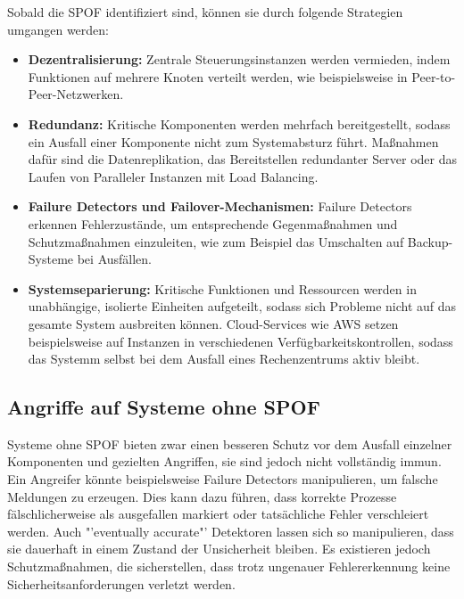 \documentclass[a4paper,12pt]{article}
\begin{document}
Sobald die SPOF identifiziert sind, können sie durch folgende Strategien umgangen werden:

\begin{itemize}
    \item \textbf{Dezentralisierung:} Zentrale Steuerungsinstanzen werden vermieden, indem Funktionen auf mehrere Knoten verteilt werden, wie beispielsweise in Peer-to-Peer-Netzwerken.
    \item \textbf{Redundanz:} Kritische Komponenten werden mehrfach bereitgestellt, sodass ein Ausfall einer Komponente nicht zum Systemabsturz führt. Maßnahmen dafür sind die Datenreplikation, das Bereitstellen redundanter Server oder das Laufen von Paralleler Instanzen mit Load Balancing.
    \item \textbf{Failure Detectors und Failover-Mechanismen:} Failure Detectors erkennen Fehlerzustände, um entsprechende Gegenmaßnahmen und Schutzmaßnahmen einzuleiten, wie zum Beispiel das Umschalten auf Backup-Systeme bei Ausfällen.
    \item \textbf{Systemseparierung:} Kritische Funktionen und Ressourcen werden in unabhängige, isolierte Einheiten aufgeteilt, sodass sich Probleme nicht auf das gesamte System ausbreiten können. Cloud-Services wie AWS setzen beispielsweise auf Instanzen in verschiedenen Verfügbarkeitskontrollen, sodass das Systemm selbst bei dem Ausfall eines Rechenzentrums aktiv bleibt.
\end{itemize}

\subsection{Angriffe auf Systeme ohne SPOF}
Systeme ohne SPOF bieten zwar einen besseren Schutz vor dem Ausfall einzelner Komponenten und gezielten Angriffen, sie sind jedoch nicht vollständig immun. Ein Angreifer könnte beispielsweise Failure Detectors manipulieren, um falsche Meldungen zu erzeugen. Dies kann dazu führen, dass korrekte Prozesse fälschlicherweise als ausgefallen markiert oder tatsächliche Fehler verschleiert werden. Auch "'eventually accurate"' Detektoren lassen sich so manipulieren, dass sie dauerhaft in einem Zustand der Unsicherheit bleiben. Es existieren jedoch Schutzmaßnahmen, die sicherstellen, dass trotz ungenauer Fehlererkennung keine Sicherheitsanforderungen verletzt werden. \cite{10.1145/1052796.1052806}
\end{document}
